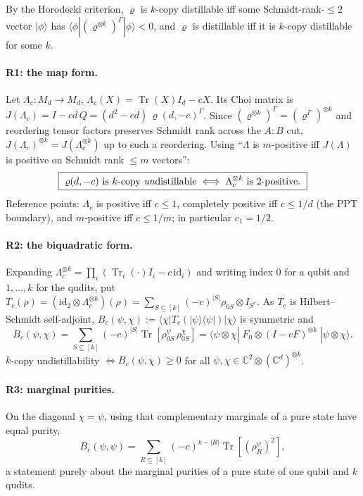 \documentclass[11pt]{article}
\theoremstyle{definition}
\theoremstyle{plain}
\newcommand{\Tr}{\operatorname{Tr}}
\newcommand{\id}{\mathrm{id}}
\newcommand{\CC}{\mathbb{C}}
\begin{document}
By the Horodecki criterion, $\varrho$ is $k$-copy distillable iff some Schmidt-rank-$\le2$
vector $|\phi\rangle$ has $\langle\phi|(\varrho^{\otimes k})^\Gamma|\phi\rangle<0$, and
$\varrho$ is distillable iff it is $k$-copy distillable for some $k$.

\paragraph{R1: the map form.} Let $\Lambda_c:M_d\to M_d$, $\Lambda_c(X)=\Tr(X)I_d-cX$.
Its Choi matrix is $J(\Lambda_c)=I-cd\,Q=(d^2-cd)\,\varrho(d,-c)^\Gamma$. Since
$(\varrho^{\otimes k})^\Gamma=(\varrho^\Gamma)^{\otimes k}$ and reordering tensor factors
preserves Schmidt rank across the $A{:}B$ cut, $J(\Lambda_c)^{\otimes k}
=J(\Lambda_c^{\otimes k})$ up to such a reordering. Using ``$\Lambda$ is $m$-positive iff
$J(\Lambda)$ is positive on Schmidt rank $\le m$ vectors'':
\[
\boxed{\ \varrho(d,-c)\text{ is }k\text{-copy \emph{un}distillable}\iff
\Lambda_c^{\otimes k}\text{ is }2\text{-positive}.\ }
\]
Reference points: $\Lambda_c$ is positive iff $c\le1$, completely positive iff $c\le1/d$
(the PPT boundary), and $m$-positive iff $c\le1/m$; in particular $c_1=1/2$.

\paragraph{R2: the biquadratic form.} Expanding
$\Lambda_c^{\otimes k}=\prod_i(\Tr_i(\cdot)I_i-c\,\id_i)$ and writing index $0$ for a
qubit and $1,\dots,k$ for the qudits, put
$T_c(\rho)=(\id_2\otimes\Lambda_c^{\otimes k})(\rho)
=\sum_{S\subseteq[k]}(-c)^{|S|}\rho_{0S}\otimes I_{S^c}$. As $T_c$ is
Hilbert--Schmidt self-adjoint, $B_c(\psi,\chi):=\langle\chi|T_c(|\psi\rangle\langle\psi|)|\chi\rangle$
is symmetric and
\[
B_c(\psi,\chi)=\sum_{S\subseteq[k]}(-c)^{|S|}\Tr\!\left[\rho^\psi_{0S}\,\rho^\chi_{0S}\right]
=\langle\psi\otimes\chi|\;F_0\otimes(I-cF)^{\otimes k}\;|\psi\otimes\chi\rangle .
\]
$k$-copy undistillability $\iff B_c(\psi,\chi)\ge0$ for all
$\psi,\chi\in\CC^2\otimes(\CC^d)^{\otimes k}$.

\paragraph{R3: marginal purities.} On the diagonal $\chi=\psi$, using that complementary
marginals of a pure state have equal purity,
\[
B_c(\psi,\psi)=\sum_{R\subseteq[k]}(-c)^{k-|R|}\Tr\!\left[(\rho^\psi_R)^2\right],
\]
a statement purely about the marginal purities of a pure state of one qubit and $k$ qudits.
\end{document}
